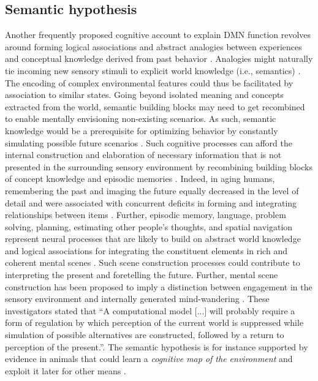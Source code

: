 \documentclass[10pt,letterpaper]{article}
\begin{document}
\subsection{Semantic hypothesis}
Another frequently proposed cognitive account to explain DMN function revolves
around forming logical associations and abstract analogies between
experiences and conceptual knowledge derived from past behavior
\citep{bar2007proactive, binder1999conceptual, constantinescu2016organizing}.
Analogies might naturally tie incoming new sensory stimuli to
explicit world knowledge (i.e., semantics)
\citep{bar2009proactive}.
The encoding of complex environmental features could thus be facilitated
by association to similar states.
%
Going beyond isolated meaning and concepts extracted from the world,
semantic building blocks may need to get recombined to enable
mentally envisioning non-existing scenarios.
As such, semantic knowledge would be a prerequisite for optimizing behavior
by constantly simulating possible future scenarios
\citep{boyer2008evolutionary, binder2011neurobiology}.
Such cognitive processes can afford
the internal construction and elaboration of necessary information
that is not presented in the surrounding sensory environment
by recombining building blocks of
concept knowledge and episodic memories
\citep{hassabis2009construction}.
Indeed, in aging humans, remembering the past and imaging the future
equally decreased in the level of detail and were associated with
concurrent deficits in forming and integrating relationships between
items \citep{addis2008age, spreng2006temporal}.
Further,
episodic memory, language, problem solving,
planning, estimating other people's thoughts, and spatial navigation
represent neural processes that are likely to
build on abstract world knowledge and logical associations
for integrating the constituent elements in rich and coherent mental scenes
\citep{schacter2007remembering}.
Such scene construction processes could contribute to interpreting the
present and foretelling the future.
Further,
mental scene construction has been proposed
to imply a distinction between
engagement in the sensory environment
and internally generated mind-wandering
\citep{buckner2007self}.
These investigators stated that
``A computational model [...] will probably require a form of
regulation by which perception of the current world is suppressed
while simulation of possible alternatives are constructed,
followed by a return to perception of the present.''.
The semantic hypothesis is for instance supported by evidence in animals that
could learn a \textit{cognitive map of the environment}
and exploit it later for other means \citep{tolman1948cognitive}.
\end{document}
